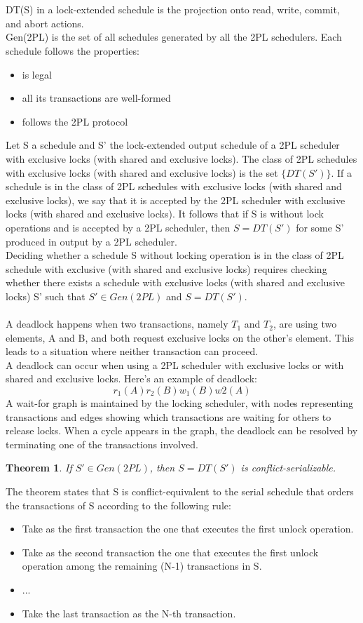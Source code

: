 \documentclass{article}
\newtheorem{theorem}{Theorem}
\begin{document}
\\\\
DT(S) in a lock-extended schedule is the projection onto read, write, commit, and abort actions.
\\
Gen(2PL) is the set of all schedules generated by all the 2PL schedulers. Each schedule follows the properties:
\begin{itemize}
    \item is legal
    \item all its transactions are well-formed
    \item follows the 2PL protocol
\end{itemize}
Let S a schedule and S' the lock-extended output schedule of a 2PL scheduler with exclusive locks (with shared and exclusive locks). The class of 2PL schedules with exclusive locks (with shared and exclusive locks) is the set $\{DT(S')\}$. If a schedule is in the class of 2PL schedules with exclusive locks (with shared and exclusive locks), we say that it is accepted by the 2PL scheduler with exclusive locks (with shared and exclusive locks). It follows that if S is without lock operations and is accepted by a 2PL scheduler, then $S = DT(S')$ for some S' produced in output by a 2PL scheduler.
\\
Deciding whether a schedule S without locking operation is in the class of 2PL schedule with exclusive (with shared and exclusive locks) requires checking whether there exists a schedule with exclusive locks (with shared and exclusive locks) S' such that $S' \in Gen(2PL)$ and $S = DT(S')$.
\\\\
A deadlock happens when two transactions, namely $T_1$ and $T_2$, are using two elements, A and B, and both request exclusive locks on the other's element. This leads to a situation where neither transaction can proceed.
\\
A deadlock can occur when using a 2PL scheduler with exclusive locks or with shared and exclusive locks.
Here's an example of deadlock: $$r_1(A) r_2(B) w_1(B) w2(A)$$
A wait-for graph is maintained by the locking scheduler, with nodes representing transactions and edges showing which transactions are waiting for others to release locks. When a cycle appears in the graph, the deadlock can be resolved by terminating one of the transactions involved.
\begin{theorem}
    \label{theorem:conflict_serializable}
    If $S' \in Gen(2PL)$, then $S = DT(S')$ is conflict-serializable.
\end{theorem}
The theorem states that S is conflict-equivalent to the serial schedule that orders the transactions of S according to the following rule:
\begin{itemize}
    \item Take as the first transaction the one that executes the first unlock operation.
    \item Take as the second transaction the one that executes the first unlock operation among the remaining (N-1) transactions in S.
    \item ...
    \item Take the last transaction as the N-th transaction.
\end{itemize}
\end{document}
